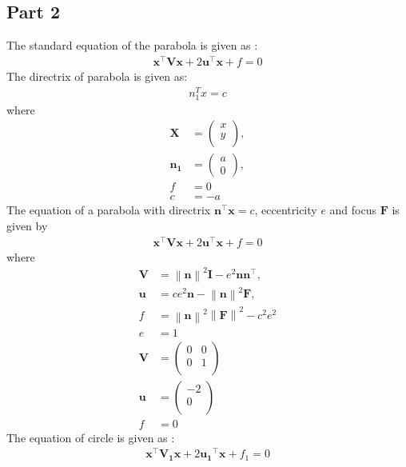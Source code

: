\documentclass[journal,10pt,twocolumn]{article}
\providecommand{\norm}[1]{\left\lVert#1\right\rVert}
\let\vec\mathbf
\newcommand{\myvec}[1]{\ensuremath{\begin{pmatrix}#1\end{pmatrix}}}
\begin{document}
\subsection*{Part 2}
The standard equation of the parabola is given as :
\begin{align}
\vec{x}^{\top}\vec{V}\vec{x}+2\vec{u}^{\top}\vec{x}+f=0
\end{align}
The directrix of parabola is given as:
\begin{align}
		n_1^Tx=c	
\end{align}
where
\begin{align}
	\label{eq:V_matrix}
	\vec{X} &= \myvec{x \\
	                   y \\},
	\\
	\label{eq:u_vector}
	\vec{n_1} &= \myvec{a\\0},
	\\
	\label{eq:f_value}
	f &= 0
	\\
	c&=-a
\end{align}
The equation of  a parabola with directrix $\vec{n}^{\top}\vec{x} = c$, eccentricity $e$ and focus $\vec{F}$ is given by 
\begin{align}
    \label{eq:conic_quad_form}
    \vec{x}^{\top}\vec{V}\vec{x}+2\vec{u}^{\top}\vec{x}+f=0
    \end{align}
where     
\begin{align}
  \label{eq:conic_quad_form_v}
\vec{V} &=\norm{\vec{n}}^2\vec{I}-e^2\vec{n}\vec{n}^{\top}, 
\\
\label{eq:conic_quad_form_u}
\vec{u} &= ce^2\vec{n}-\norm{\vec{n}}^2\vec{F}, 
\\
\label{eq:conic_quad_form_f}
f &= \norm{\vec{n}}^2\norm{\vec{F}}^2-c^2e^2
\\
e&=1
\\
\vec{V}&=\begin{pmatrix}
	0 & 0\\
	0 & 1\\
	\end{pmatrix} \\
    \vec{u}&=\begin{pmatrix}
	-2 \\
	0 \\
	\end{pmatrix} \\
	f&=0
    \end{align}
The equation of circle is given as :
\begin{align}
    \label{eq:conic_quad_form}
    \vec{x}^{\top}\vec{V_1}\vec{x}+2\vec{u_1}^{\top}\vec{x}+f_1=0
    \end{align}
\end{document}
